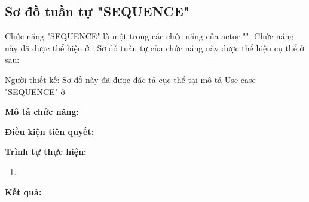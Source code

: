 \subsection{Sơ đồ tuần tự "SEQUENCE"}
\setcounter{figure}{0}

Chức năng "SEQUENCE" là một trong các chức năng của actor "".
Chức năng này đã được thể hiện ở \myref{}.
Sơ đồ tuần tự của chức năng này được thể hiện cụ thể ở \myref{} sau:

Người thiết kế:
Sơ đồ này đã được đặc tả cục thể tại mô tả Use case "SEQUENCE" ở 

\noindent
\textbf{Mô tả chức năng:}

\noindent
\textbf{Điều kiện tiên quyết:}

\noindent
\textbf{Trình tự thực hiện:}

\noindent
\begin{enumerate}
  \item
\end{enumerate}

\noindent
\textbf{Kết quả:}

